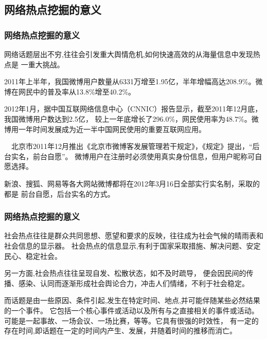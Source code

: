 \documentclass[CJKutf8, table]{beamer}
\begin{document}
\begin{CJK}{UTF8}{gbsn}
\subsection{网络热点挖掘的意义}
\begin{frame}
  \frametitle{网络热点挖掘的意义}
  \begin{scriptsize}
  \begin{block}{}
    网络话题层出不穷,往往会引发重大舆情危机,如何快速高效的从海量信息中发现热点是
    一重大挑战。
  \end{block}
  \pause
  \begin{block}{}
    2011年上半年，我国微博用户数量从6331万增至1.95亿，半年增幅高达208.9\%。微博在网民中的普及率从13.8\%增至40.2\%。
  \end{block}
  \pause
  \begin{block}{}
      2012年1月，据中国互联网络信息中心（CNNIC）报告显示，截至2011年12月底，我国微博用户数达到2.5亿，
      较上一年底增长了296.0\%，网民使用率为48.7\%。微博用一年时间发展成为近一半中国网民使用的重要互联网应用。 
  \end{block}
  \pause
  \begin{block}{}
    　北京市2011年12月推出《北京市微博客发展管理若干规定》，《规定》提出，``后台实名，前台自愿''。
    微博用户在注册时必须使用真实身份信息，但用户昵称可自愿选择。
  \end{block}
  \pause
  \begin{block}{}
    新浪、搜狐、网易等各大网站微博都将在2012年3月16日全部实行实名制，采取的都是
    前台自愿，后台实名的方式。
  \end{block}
\end{scriptsize}
\end{frame}

\begin{frame}
  \frametitle{网络热点挖掘的意义}
  \begin{scriptsize}
  \begin{block}{}
    社会热点往往是群众共同思想、愿望和要求的反映，往往成为社会气候的晴雨表和社会信息的显示器。
    社会热点的信息显示,有利于国家采取措施、解决问题、安定民心、稳定社会。
  \end{block}
  \pause
  \begin{block}{}
    另一方面,社会热点往往呈现自发、松散状态，如不及时疏导，
    便会因民间的传播、感染、认同而逐渐形成社会舆论合力，冲击人们情绪，不利于社会稳定。
  \end{block}
  \pause
  \begin{block}{}
    而话题是由一些原因、条件引起,发生在特定时间、地点,并可能伴随某些必然结果的一个事件。
    它包括一个核心事件或活动以及所有与之直接相关的事件或活动。
    可能是一起事故、一场会议、一场比赛，等等。它具有很强的时效性，
    有一定的存在时间,即话题在一定的时间内产生、发展，并随着时间的推移而消亡。
  \end{block}
  \end{scriptsize}
\end{frame}

\end{CJK}
\end{document}
